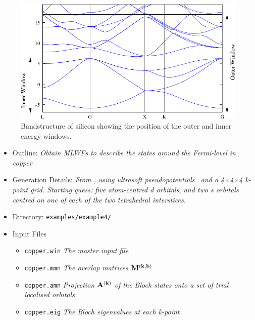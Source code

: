 \documentclass[a4paper,11pt,twoside]{article}
\begin{document}
\begin{figure}[h]
\begin{center}
\includegraphics{si}
\caption{Bandstructure of silicon showing the position of the outer
  and inner energy windows.} 
\label{fig:si.bnd}
\end{center}
\end{figure}




\begin{itemize}
\item{Outline: \it{Obtain MLWFs to describe the states around the
    Fermi-level in copper}} 
\item{Generation Details: \it{From \pwscf, using ultrasoft
    pseudopotentials~\cite{vanderbilt-prb90} and a
    4$\times$4$\times$4 k-point grid. Starting guess: five 
    atom-centred d orbitals, and two s orbitals centred on one of each
    of the two tetrahedral interstices.}}
\item{Directory: {\tt examples/example4/}}
\item{Input Files}
\begin{itemize}
\item{ {\tt copper.win}  {\it The master input file}}
\item{ {\tt copper.mmn}  {\it The overlap matrices $\mathbf{M}^{(\mathbf{k},\mathbf{b})}$}}
\item{ {\tt copper.amn}  {\it Projection $\mathbf{A}^{(\mathbf{k})}$ of the Bloch states onto a
    set of trial localised orbitals}} 
\item{ {\tt copper.eig}  {\it The Bloch eigenvalues at each k-point}}
\end{itemize}

\end{itemize}
\end{document}
